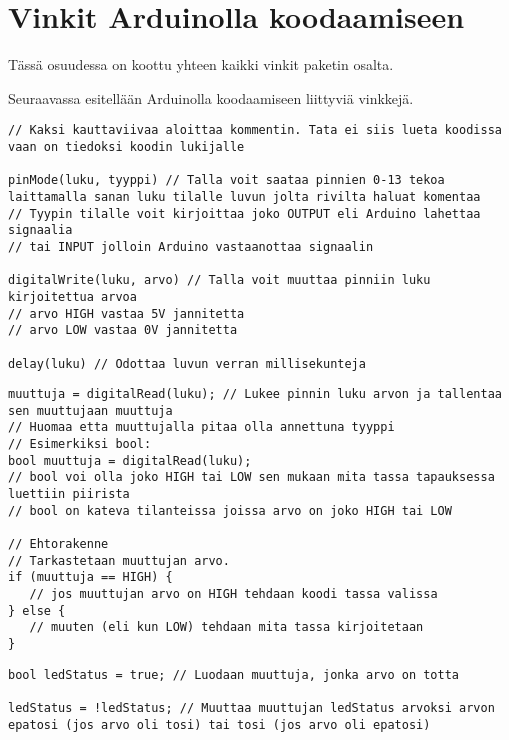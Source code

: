 \chapter{Vinkit Arduinolla koodaamiseen}
Tässä osuudessa on koottu yhteen kaikki vinkit paketin osalta.

\begin{tcolorbox}[colback=white,title=Vinkkejä Arduinolla koodaamiseen!,colbacktitle=purple!90, breakable]
Seuraavassa esitellään Arduinolla koodaamiseen liittyviä vinkkejä. 
\begin{lstlisting}
// Kaksi kauttaviivaa aloittaa kommentin. Tata ei siis lueta koodissa vaan on tiedoksi koodin lukijalle

pinMode(luku, tyyppi) // Talla voit saataa pinnien 0-13 tekoa laittamalla sanan luku tilalle luvun jolta rivilta haluat komentaa
// Tyypin tilalle voit kirjoittaa joko OUTPUT eli Arduino lahettaa signaalia
// tai INPUT jolloin Arduino vastaanottaa signaalin

digitalWrite(luku, arvo) // Talla voit muuttaa pinniin luku kirjoitettua arvoa
// arvo HIGH vastaa 5V jannitetta
// arvo LOW vastaa 0V jannitetta

delay(luku) // Odottaa luvun verran millisekunteja
\end{lstlisting}
\end{tcolorbox}

\begin{tcolorbox}[colback=white,title=Vinkkejä Arduinolla koodaamiseen!,colbacktitle=purple!90, breakable]
\begin{lstlisting}
muuttuja = digitalRead(luku); // Lukee pinnin luku arvon ja tallentaa sen muuttujaan muuttuja
// Huomaa etta muuttujalla pitaa olla annettuna tyyppi
// Esimerkiksi bool:
bool muuttuja = digitalRead(luku); 
// bool voi olla joko HIGH tai LOW sen mukaan mita tassa tapauksessa luettiin piirista
// bool on kateva tilanteissa joissa arvo on joko HIGH tai LOW

// Ehtorakenne
// Tarkastetaan muuttujan arvo.
if (muuttuja == HIGH) {
   // jos muuttujan arvo on HIGH tehdaan koodi tassa valissa
} else {
   // muuten (eli kun LOW) tehdaan mita tassa kirjoitetaan
}
\end{lstlisting}
\end{tcolorbox}

\begin{tcolorbox}[colback=white,title=Vinkkejä Arduinolla koodaamiseen!,colbacktitle=purple!90, breakable]
\begin{lstlisting}
bool ledStatus = true; // Luodaan muuttuja, jonka arvo on totta

ledStatus = !ledStatus; // Muuttaa muuttujan ledStatus arvoksi arvon epatosi (jos arvo oli tosi) tai tosi (jos arvo oli epatosi)
\end{lstlisting}
\end{tcolorbox}

